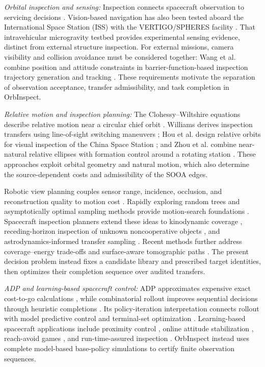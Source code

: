 \documentclass{IEEEtaes}
\begin{document}
\emph{Orbital inspection and sensing:} Inspection connects spacecraft observation to servicing decisions \cite{flores2014review,kimura2000inspection}. Vision-based navigation has also been tested aboard the International Space Station (ISS) with the VERTIGO/SPHERES facility \cite{tweddle2016facility}. That intravehicular microgravity testbed provides experimental sensing evidence, distinct from external structure inspection. For external missions, camera visibility and collision avoidance must be considered together: Wang et al. combine position and attitude constraints in barrier-function-based inspection trajectory generation and tracking \cite{wang2024inspection}. These requirements motivate the separation of observation acceptance, transfer admissibility, and task completion in OrbInspect.

\emph{Relative motion and inspection planning:} The Clohessy--Wiltshire equations describe relative motion near a circular chief orbit \cite{clohessy1960terminal,wertz2011space}. Williams derives inspection transfers using line-of-sight switching maneuvers \cite{williams2002inspection}; Hou et al. design relative orbits for visual inspection of the China Space Station \cite{hou2024relative}; and Zhou et al. combine near-natural relative ellipses with formation control around a rotating station \cite{zhou2026formation}. These approaches exploit orbital geometry and natural motion, which also determine the source-dependent costs and admissibility of the SOOA edges.

Robotic view planning couples sensor range, incidence, occlusion, and reconstruction quality to motion cost \cite{scott2003view}. Rapidly exploring random trees and asymptotically optimal sampling methods provide motion-search foundations \cite{lavalle1998rapidly,karaman2011sampling}. Spacecraft inspection planners extend these ideas to kinodynamic coverage \cite{faghihi2022kinodynamic,faghihi2023multiple}, receding-horizon inspection of unknown noncooperative objects \cite{maestrini2022guidance}, and astrodynamics-informed transfer sampling \cite{deka2023astrodynamics}. Recent methods further address coverage--energy trade-offs \cite{apodaca2025trajectory} and surface-aware tomographic paths \cite{zhou2026tomographic}. The present decision problem instead fixes a candidate library and prescribed target identities, then optimizes their completion sequence over audited transfers.

\emph{ADP and learning-based spacecraft control:} ADP approximates expensive exact cost-to-go calculations \cite{bertsekas1996neuro,bertsekas2020rollout}, while combinatorial rollout improves sequential decisions through heuristic completions \cite{bertsekas1997combinatorial}. Its policy-iteration interpretation connects rollout with model predictive control and terminal-set optimization \cite{bertsekas2005survey,bertsekas2017iterations}. Learning-based spacecraft applications include proximity control \cite{hu2021learning,tian2024proximity}, online attitude stabilization \cite{luo2025attitude}, reach-avoid games \cite{tang2025reachavoid}, and run-time-assured inspection \cite{vanwijk2024inspection}. OrbInspect instead uses complete model-based base-policy simulations to certify finite observation sequences.
\end{document}
